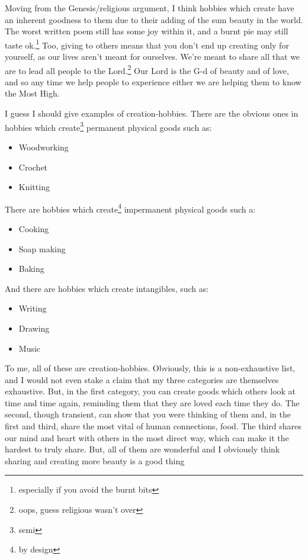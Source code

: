 \documentclass[12pt]{article}[titlepage]
\newcommand{\1}{\={a}}
\newcommand{\2}{\={e}}
\newcommand{\3}{\={\i}}
\newcommand{\4}{\=o}
\newcommand{\5}{\=u}
\newcommand{\6}{\={A}}
\renewcommand{\,}{\textsuperscript{,}}
\begin{document}
Moving from the Genesis/religious argument, I think hobbies which create have an inherent goodness to them due to their adding of the sum beauty in the world.
The worst written poem still has some joy within it, and a burnt pie may still taste ok.\footnote{especially if you avoid the burnt bits}
Too, giving to others means that you don't end up creating only for yourself, as our lives aren't meant for ourselves.
We're meant to share all that we are to lead all people to the Lord.\footnote{oops, guess religious wasn't over}
Our Lord is the G-d of beauty and of love, and so any time we help people to experience either we are helping them to know the Most High.

I guess I should give examples of creation-hobbies.
There are the obvious ones in hobbies which create\footnote{semi} permanent physical goods such as:
\begin{itemize}
\item Woodworking
\item Crochet
\item Knitting
\end{itemize}
There are hobbies which create\footnote{by design} impermanent physical goods such a:
\begin{itemize}
\item Cooking
\item Soap making
\item Baking
\end{itemize}
And there are hobbies which create intangibles, such as:
\begin{itemize}
\item Writing
\item Drawing
\item Music
\end{itemize}
To me, all of these are creation-hobbies.
Obviously, this is a non-exhaustive list, and I would not even stake a claim that my three categories are themselves exhaustive.
But, in the first category, you can create goods which others look at time and time again, reminding them that they are loved each time they do.
The second, though transient, can show that you were thinking of them and, in the first and third, share the most vital of human connections, food.
The third shares our mind and heart with others in the most direct way, which can make it the hardest to truly share.
But, all of them are wonderful and I obviously think sharing and creating more beauty is a good thing
\end{document}

